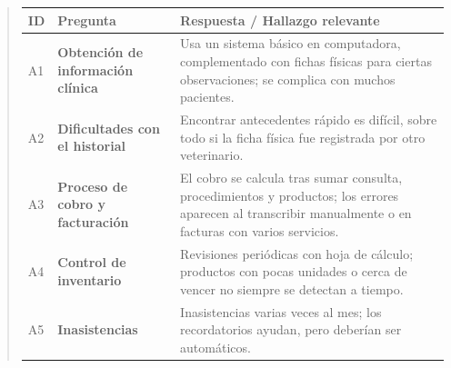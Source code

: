 \documentclass[
]{article}
\newcounter{none} %
\begin{document}
\begin{quote}
{\def\LTcaptype{none} %
\begin{longtable}[]{|
  >{\centering\arraybackslash}p{}|
  >{\raggedright\arraybackslash}p{}|
  >{\raggedright\arraybackslash}p{}|}
\hline
\begin{minipage}[b]{\linewidth}\centering
\textbf{ID}
\end{minipage} & \begin{minipage}[b]{\linewidth}\centering
\textbf{Pregunta}
\end{minipage} & \begin{minipage}[b]{\linewidth}\raggedright
\textbf{Respuesta / Hallazgo relevante}
\end{minipage} \\
\hline
\endhead
\hline
\endlastfoot
A1 & \textbf{Obtención de información clínica} &
\begin{minipage}[t]{\linewidth}\raggedright
Usa un sistema básico en computadora, complementado con fichas físicas para ciertas observaciones; se complica con muchos pacientes.
\end{minipage} \\
\hline
A2 & \textbf{Dificultades con el historial} &
\begin{minipage}[t]{\linewidth}\raggedright
Encontrar antecedentes rápido es difícil, sobre todo si la ficha física fue registrada por otro veterinario.
\end{minipage} \\
\hline
A3 & \textbf{Proceso de cobro y facturación} &
\begin{minipage}[t]{\linewidth}\raggedright
El cobro se calcula tras sumar consulta, procedimientos y productos; los errores aparecen al transcribir manualmente o en facturas con varios servicios.
\end{minipage} \\
\hline
A4 & \textbf{Control de inventario} &
\begin{minipage}[t]{\linewidth}\raggedright
Revisiones periódicas con hoja de cálculo; productos con pocas unidades o cerca de vencer no siempre se detectan a tiempo.
\end{minipage} \\
\hline
A5 & \textbf{Inasistencias} &
\begin{minipage}[t]{\linewidth}\raggedright
Inasistencias varias veces al mes; los recordatorios ayudan, pero deberían ser automáticos.
\end{minipage} \\

\end{longtable}}
\end{quote}
\end{document}
